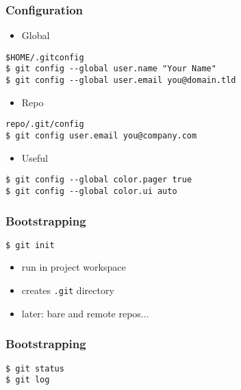 \documentclass[english]{beamer}
\newcommand{\CMD}[1]{%
\texttt{\textcolor{code-blue}{#1}}%
}
\begin{document}
\begin{frame}
\frametitle{Configuration}

\begin{itemize}
    \item Global
\end{itemize}

\CMD{\$HOME/.gitconfig} \\
\CMD{\$ git config {-}-global user.name "Your Name"} \\
\CMD{\$ git config {-}-global user.email you@domain.tld}

\begin{itemize}
    \item Repo
\end{itemize}

\CMD{repo/.git/config} \\
\CMD{\$ git config user.email you@company.com}

\begin{itemize}
    \item Useful
\end{itemize}

\CMD{\$ git config {-}-global color.pager true} \\
\CMD{\$ git config {-}-global color.ui auto}

\end{frame}

\begin{frame}
\frametitle{Bootstrapping}

\CMD{\$ git init} \\
\begin{itemize}
        \item run in project workspace
        \item creates \CMD{.git} directory \\
        \vspace{.1\textheight}
        \item later: bare and remote repos...
\end{itemize}
\end{frame}

\begin{frame}
\frametitle{Bootstrapping}

\CMD{\$ git status} \\
\vspace{.1\textheight}
\CMD{\$ git log} \\

\end{frame}
\end{document}
